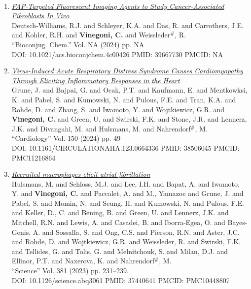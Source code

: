 \documentclass{resume}
\newcommand{\titresection}[1]
{
  \vspace{0em}
  \definecolor{gris_clair}{rgb}{0.90, 0.90, 0.90}
  \colorbox{gris_clair}{\makebox[\textwidth][l]{\rule[-0.1em]{0em}{0.5em}\large{\textsc{#1}}}} \\
}
\begin{document}
\begin{category}{~~}
\hypertarget{articlesa}{\citemnobullet \titresection{\textbf{\large
PUBLICATIONS: ARTICLES}}}



\begin{enumerate}

\item \href{https://cvinegoni.github.io/assets/pdf/papers/2024-CRCLT.pdf}{\it  FAP-Targeted Fluorescent Imaging Agents to Study Cancer-Associated Fibroblasts In Vivo} \\ Deutsch-Williams, R.J. and Schleyer, K.A. and Das, R. and Carrothers, J.E. and Kohler, R.H. and {\bf Vinegoni, C.}  and Weissleder$^\#$, R. \\ ``Bioconjug. Chem.'' Vol. NA (2024) pp. NA \\ DOI: 10.1021/acs.bioconjchem.4c00426 PMID: 39667730 PMCID:  NA


\item \href{https://cvinegoni.github.io/assets/pdf/papers/2024-CRCLT.pdf}{\it  Virus-Induced Acute Respiratory Distress Syndrome Causes Cardiomyopathy Through Eliciting Inflammatory Responses in the Heart} \\Grune, J. and Bajpai, G. and Ocak, P.T. and Kaufmann, E. and Mentkowksi, K. and Pabel, S. and Kumowski, N. and Pulous, F.E. and Tran, K.A. and Rohde, D. and Zhang, S. and Iwamoto, Y. and Wojtkiewicz, G.R. and {\bf Vinegoni, C.}  and Green, U. and Swirski, F.K. and Stone, J.R. and Lennerz, J.K. and Divangahi, M. and Hulsmans, M. and Nahrendorf$^\#$,  M. \\ ``Cardiology'' Vol. 150 (2024) pp. 49 \\ DOI: 10.1161/CIRCULATIONAHA.123.0664336 PMID: 38506045 PMCID:  PMC11216864

\item \href{https://cvinegoni.github.io/assets/pdf/papers/2023-SCIENCE.pdf}{\it  Recruited macrophages elicit atrial fibrillation} \\ Hulsmans, M. and Schloss, M.J. and Lee, I.H. and Bapat, A. and Iwamoto, Y. and {\bf Vinegoni, C.} and Paccalet, A. and M., Yamazoe and Grune, J. and Pabel, S. and Momin, N. and Seung, H. and Kumowski, N. and Pulous, F.E. and Keller, D., C. and Bening, B. and Green, U. and Lennerz, J.K. and Mitchell, R.N. and Lewis, A. and Casadei, B. and Iborra-Egea, O. and Bayes-Genis, A. and Sossalla, S. and Ong, C.S. and Pierson, R.N. and Aster, J.C. and Rohde, D. and Wojtkiewicz, G.R. and Weissleder, R. and Swirski, F.K. and Tellides, G. and Tolis, G. and Melnitchouk, S. and Milan, D.J. and Ellinor, P.T. and Naxerova, K. and Nahrendorf$^\#$, M. \\ ``Science'' Vol. 381 (2023) pp. 231–239. \\ DOI: 10.1126/science.abq3061 PMID: 37440641 PMCID: PMC10448807


\end{enumerate}
\end{category}
\end{document}
